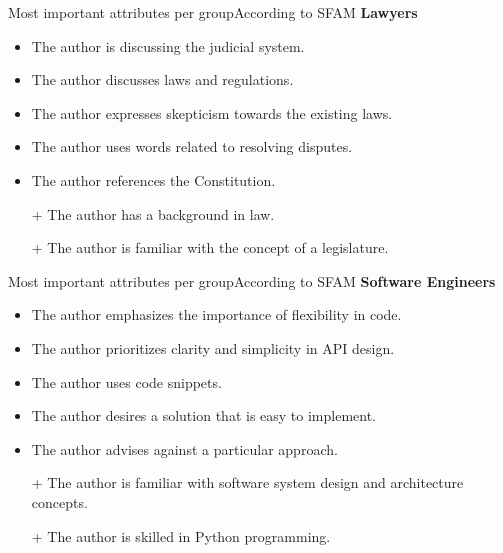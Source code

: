 \documentclass[]{beamer}
\begin{document}
\begin{frame}{Most important attributes per group}{According to SFAM}
  \textbf{Lawyers}
  \begin{itemize}
    \item The author is discussing the judicial system.
    \item The author discusses laws and regulations.
    \item The author expresses skepticism towards the existing laws.
    \item The author uses words related to resolving disputes.
    \item The author references the Constitution.
    \item[+] The author has a background in law.
    \item[+] The author is familiar with the concept of a legislature.
  \end{itemize}
\end{frame}

\begin{frame}{Most important attributes per group}{According to SFAM}
  \textbf{Software Engineers}
  \begin{itemize}
    \item The author emphasizes the importance of flexibility in code.
    \item The author prioritizes clarity and simplicity in API design.
    \item The author uses code snippets.
    \item The author desires a solution that is easy to implement.
    \item The author advises against a particular approach.
    \item[+] The author is familiar with software system design and architecture concepts.
    \item[+] The author is skilled in Python programming.
  \end{itemize}
\end{frame}
\end{document}
